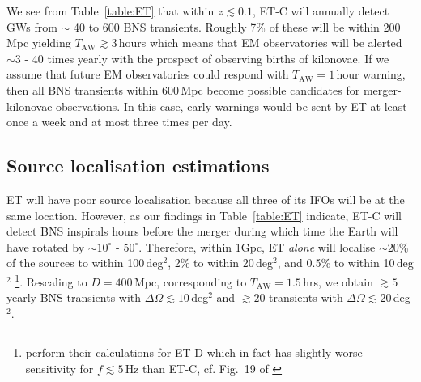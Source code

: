 \documentclass{aa}
\begin{document}
We see from Table~\ref{table:ET} that %
within $z\lesssim 0.1$, %
ET-C will annually detect GWs from $\sim$ 40 to 600 BNS transients.
Roughly 7\% of these will be within 200\,Mpc yielding $T_\text{AW}\gtrsim 3\,$hours which means that EM observatories will be alerted $\sim 3$ - 40 times yearly with the prospect of observing births of kilonovae.
If we assume that future EM observatories could respond with $T_\text{AW}=1\,$hour warning, then
all BNS transients within 600\,Mpc become possible candidates for merger-kilonovae observations.
In this case, early warnings would be sent by ET at least once a week and at most three times per day.

\subsection{Source localisation estimations}
ET will have poor source localisation because all three of its IFOs will be at the same location. 
However, as our findings in Table~\ref{table:ET} indicate, ET-C will
detect BNS inspirals hours before the merger during which time the Earth will have rotated by $\sim 10^\circ$ - $50^\circ$.
Therefore, within 1Gpc, ET \emph{alone} will localise  $\sim20$\% of the sources to within 100\,deg$^2$, 
2\% to within 20\,deg$^2$, and 0.5\% to within 10\,deg$^2$ \citep{Zhao:2017cbb} 
\footnote{\cite{Zhao:2017cbb} perform their calculations for ET-D which in fact has slightly worse sensitivity for $f\lesssim 5\,$Hz than ET-C, cf. Fig.~19 of \cite{GW_IFO_LRR}}.
Rescaling to $D=400\,$Mpc, corresponding to $T_\text{AW}= 1.5\,$hrs, we obtain $\gtrsim 5$ yearly BNS transients with $\Delta\Omega \lesssim 10\,$deg$^2$ and $\gtrsim20$ transients with $\Delta\Omega \lesssim 20\,$deg$^2$.
\end{document}
